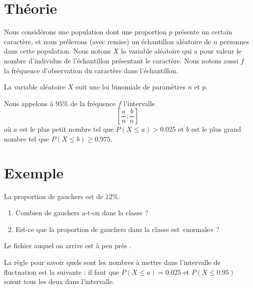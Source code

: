 \section{Théorie}

Nous considérons une population dont une proportion \( p\)  présente un certain caractère, et nous prélevons (avec remise) un échantillon aléatoire de \( n\) personnes dans cette population. Nous notons \( X\) la variable aléatoire qui a pour valeur le nombre d'individus de l'échantillon présentant le caractère. Nous notons aussi \( f\) la fréquence d'observation du caractère dans l'échantillon.

La variable aléatoire \( X\) suit une loi binomiale de paramètres \( n\) et \( p\). 

Nous appelons  à \( 95\%\) de la fréquence \( f\) l'intervalle 
\begin{equation}
    \left[ \frac{ a }{ n };\frac{ b }{ n } \right]
\end{equation}
où \(  a\) est le plus petit nombre tel que \( P(X\leq a)>0.025\) et \( b\) est le plus grand nombre tel que \( P(X\leq b)\geq 0.975\).

\section{Exemple}

La proportion de gauchers est de \( 12\%\).
\begin{enumerate}
    \item
        Combien de gauchers a-t-on dans la classe ?
    \item
        Est-ce que la proportion de gauchers dans la classe est «normale» ?
\end{enumerate}
Le fichier auquel on arrive est à peu près .

\begin{Aretenir}
    La règle pour savoir quels sont les nombres à mettre dans l'intervalle de fluctuation est la suivante : il faut que \( P(X\leq a)=0.025\) et \( P(X\leq 0.95)\) soient tous les deux dans l'intervalle.
\end{Aretenir}

